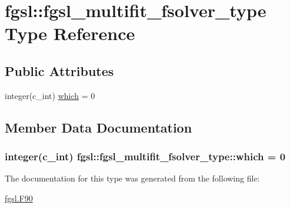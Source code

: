 \hypertarget{structfgsl_1_1fgsl__multifit__fsolver__type}{\section{fgsl\-:\-:fgsl\-\_\-multifit\-\_\-fsolver\-\_\-type Type Reference}
\label{structfgsl_1_1fgsl__multifit__fsolver__type}
}
\subsection*{Public Attributes}
\begin{DoxyCompactItemize}
\item 
integer(c\-\_\-int) \hyperlink{structfgsl_1_1fgsl__multifit__fsolver__type_a2c8908118831ee27fef1176126635a9f}{which} = 0
\end{DoxyCompactItemize}


\subsection{Member Data Documentation}
\hypertarget{structfgsl_1_1fgsl__multifit__fsolver__type_a2c8908118831ee27fef1176126635a9f}{
\subsubsection[{which}]{\setlength{\rightskip}{0pt plus 5cm}integer(c\-\_\-int) fgsl\-::fgsl\-\_\-multifit\-\_\-fsolver\-\_\-type\-::which = 0}}\label{structfgsl_1_1fgsl__multifit__fsolver__type_a2c8908118831ee27fef1176126635a9f}


The documentation for this type was generated from the following file\-:\begin{DoxyCompactItemize}
\item 
\hyperlink{fgsl_8F90}{fgsl.\-F90}\end{DoxyCompactItemize}
